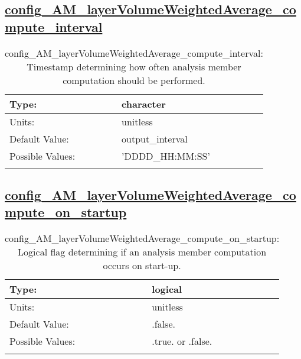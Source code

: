 \subsection[config\_AM\_layerVolumeWeightedAverage\_compute\_interval]{\hyperref[sec:nm_tab_AM_layerVolumeWeightedAverage]{config\_AM\_layerVolumeWeightedAverage\_compute\_interval}}
\label{subsec:nm_sec_config_AM_layerVolumeWeightedAverage_compute_interval}
\begin{center}
\begin{longtable}{| p{2.0in} || p{4.0in} |}
    \hline
    Type: & character \\
    \hline
    Units: & \si{unitless} \\
    \hline
    Default Value: & output\_interval \\
    \hline
    Possible Values: & 'DDDD\_HH:MM:SS' \\
    \hline
    \caption{config\_AM\_layerVolumeWeightedAverage\_compute\_interval: Timestamp determining how often analysis member computation should be performed.}
\end{longtable}
\end{center}
\subsection[config\_AM\_layerVolumeWeightedAverage\_compute\_on\_startup]{\hyperref[sec:nm_tab_AM_layerVolumeWeightedAverage]{config\_AM\_layerVolumeWeightedAverage\_compute\_on\_startup}}
\label{subsec:nm_sec_config_AM_layerVolumeWeightedAverage_compute_on_startup}
\begin{center}
\begin{longtable}{| p{2.0in} || p{4.0in} |}
    \hline
    Type: & logical \\
    \hline
    Units: & \si{unitless} \\
    \hline
    Default Value: & .false. \\
    \hline
    Possible Values: & .true. or .false. \\
    \hline
    \caption{config\_AM\_layerVolumeWeightedAverage\_compute\_on\_startup: Logical flag determining if an analysis member computation occurs on start-up.}
\end{longtable}
\end{center}
